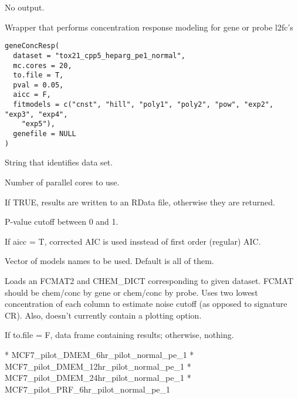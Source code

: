 \documentclass[letterpaper]{book}
\begin{document}
%
\begin{Value}
No output.
\end{Value}
%
\begin{Description}\relax
Wrapper that performs concentration response modeling for gene or probe l2fc's
\end{Description}
%
\begin{Usage}
\begin{verbatim}
geneConcResp(
  dataset = "tox21_cpp5_heparg_pe1_normal",
  mc.cores = 20,
  to.file = T,
  pval = 0.05,
  aicc = F,
  fitmodels = c("cnst", "hill", "poly1", "poly2", "pow", "exp2", "exp3", "exp4",
    "exp5"),
  genefile = NULL
)
\end{verbatim}
\end{Usage}
%
\begin{Arguments}
\begin{ldescription}
\item[\code{dataset}] String that identifies data set.

\item[\code{mc.cores}] Number of parallel cores to use.

\item[\code{to.file}] If TRUE, results are written to an RData file, otherwise they
are returned.

\item[\code{pval}] P-value cutoff between 0 and 1.

\item[\code{aicc}] If aicc = T, corrected AIC is used insstead of first order
(regular) AIC.

\item[\code{fitmodels}] Vector of models names to be used. Default is all of them.
\end{ldescription}
\end{Arguments}
%
\begin{Details}\relax
Loads an FCMAT2 and CHEM\_DICT corresponding to given dataset. FCMAT should be
chem/conc by gene or chem/conc by probe. Uses two lowest concentration of each
column to estimate noise cutoff (as opposed to signature CR). Also, doesn't
currently contain a plotting option.
\end{Details}
%
\begin{Value}
If to.file = F, data frame containing results; otherwise, nothing.

* MCF7\_pilot\_DMEM\_6hr\_pilot\_normal\_pe\_1
* MCF7\_pilot\_DMEM\_12hr\_pilot\_normal\_pe\_1
* MCF7\_pilot\_DMEM\_24hr\_pilot\_normal\_pe\_1
* MCF7\_pilot\_PRF\_6hr\_pilot\_normal\_pe\_1
\end{Value}
\end{document}
